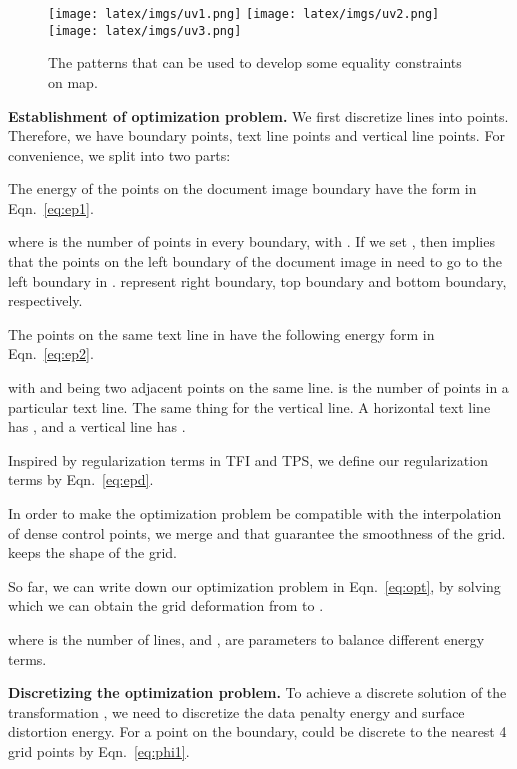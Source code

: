 \documentclass[10pt,twocolumn,letterpaper]{article}
\newcommand{\myparagraph}[1]{\vspace{1pt} \noindent \textbf{#1} }
\begin{document}
\begin{figure}[!t]
  \centering
  \vspace{-2mm}
  \texttt{[image: latex/imgs/uv1.png]}
  \texttt{[image: latex/imgs/uv2.png]}
  \texttt{[image: latex/imgs/uv3.png]}
 \vspace{-2mm}
   \caption{The  patterns that can be used to develop some equality constraints on  map.}
   \label{fig:uv}
  \vspace{1em}
\end{figure}


\myparagraph{Establishment of optimization problem.} We first discretize lines into points. Therefore, we have boundary points, text line points and vertical line points. For convenience, we split  into two parts:

The energy of the points on the document image boundary have the form in Eqn.~\eqref{eq:ep1}. 
\vspace{-0.5em}

where  is the number of points in every boundary, with . 
If we set , then  implies that the points on the left boundary of the document image in  need to go to the left boundary in .  represent right boundary, top boundary and bottom boundary, respectively.

The points on the same text line in  have the following energy form in Eqn.~\eqref{eq:ep2}. 

with  and  being two adjacent points on the same line.  is the number of points in a particular text line. The same thing for the vertical line. A horizontal text line has , and a vertical line has .

Inspired by regularization terms in TFI and TPS, we define our regularization terms by Eqn.~\eqref{eq:epd}. 

In order to make the optimization problem be compatible with the interpolation of dense control points, we merge  and  that guarantee the smoothness of the grid.  keeps the shape of the grid.  

So far, we can write down our optimization problem in Eqn.~\eqref{eq:opt}, by solving which we can obtain the grid deformation  from  to .

where  is the number of lines, and ,  are parameters to balance different energy terms.

\myparagraph{Discretizing the optimization problem.}
To achieve a discrete solution of the transformation , we need to discretize the data penalty energy and surface distortion energy. For a point  on the boundary,  could be discrete to the nearest 4 grid points  by Eqn.~\eqref{eq:phi1}. 
\end{document}
